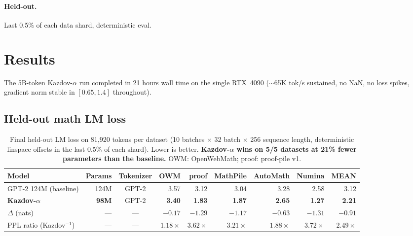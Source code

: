 \documentclass[11pt]{article}
\begin{document}
\paragraph{Held-out.}
Last 0.5\% of each data shard, deterministic eval.

\section{Results}
\label{sec:results}

The 5B-token Kazdov-$\alpha$ run completed in 21 hours wall time on
the single RTX~4090 ($\sim$65K tok/s sustained, no NaN, no loss
spikes, gradient norm stable in $[0.65, 1.4]$ throughout).

\subsection{Held-out math LM loss}

\begin{table}[h]
\centering
\footnotesize
\setlength{\tabcolsep}{4pt}
\begin{tabular}{lrcrrrrrr}
\toprule
\textbf{Model} & \textbf{Params} & \textbf{Tokenizer} & \textbf{OWM} & \textbf{proof} & \textbf{MathPile} & \textbf{AutoMath} & \textbf{Numina} & \textbf{MEAN} \\
\midrule
GPT-2 124M (baseline) & 124M & GPT-2 & 3.57 & 3.12 & 3.04 & 3.28 & 2.58 & 3.12 \\
\textbf{Kazdov-$\alpha$} & \textbf{98M} & GPT-2 & \textbf{3.40} & \textbf{1.83} & \textbf{1.87} & \textbf{2.65} & \textbf{1.27} & \textbf{2.21} \\
\midrule
$\Delta$ (nats)          & --- & --- & $-0.17$ & $-1.29$ & $-1.17$ & $-0.63$ & $-1.31$ & $\mathbf{-0.91}$ \\
PPL ratio (Kazdov$^{-1}$) & --- & --- & $1.18\times$ & $\mathbf{3.62\times}$ & $\mathbf{3.21\times}$ & $1.88\times$ & $\mathbf{3.72\times}$ & $\mathbf{2.49\times}$ \\
\bottomrule
\end{tabular}
\caption{Final held-out LM loss on 81{,}920 tokens per dataset (10
batches $\times$ 32 batch $\times$ 256 sequence length, deterministic
linspace offsets in the last 0.5\% of each shard).  Lower is better.
\textbf{Kazdov-$\alpha$ wins on 5/5 datasets at 21\% fewer parameters
than the baseline.}  OWM: OpenWebMath; proof: proof-pile v1.}
\label{tab:heldout}
\end{table}
\end{document}
